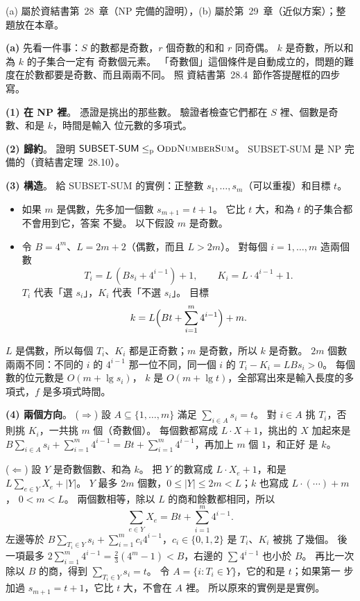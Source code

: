 \begin{pastsoln}
(a) 屬於資結書第~28~章（NP 完備的證明），(b) 屬於第~29~章（近似方案）；整題放在本章。

\textbf{(a)} 先看一件事：$S$ 的數都是奇數，$r$ 個奇數的和和 $r$ 同奇偶。 $k$ 是奇數，所以和為 $k$ 的子集合一定有
奇數個元素。 「奇數個」這個條件是自動成立的，問題的難度在於數都要是奇數、而且兩兩不同。 照
資結書第~28.4~節作答提醒框的四步寫。

\textbf{(1) 在 NP 裡}。 憑證是挑出的那些數。 驗證者檢查它們都在 $S$ 裡、個數是奇數、和是 $k$，時間是輸入
位元數的多項式。

\textbf{(2) 歸約}。 證明 $\textsf{SUBSET-SUM} \le_{\mathrm{p}} \textsc{OddNumberSum}$。 \textsf{SUBSET-SUM} 是 NP
完備的（資結書定理~28.10）。

\textbf{(3) 構造}。 給 \textsf{SUBSET-SUM} 的實例：正整數 $s_1, \ldots, s_m$（可以重複）和目標 $t$。
\begin{itemize}
\item 如果 $m$ 是偶數，先多加一個數 $s_{m+1} = t + 1$。 它比 $t$ 大，和為 $t$ 的子集合都不會用到它，答案
不變。 以下假設 $m$ 是奇數。
\item 令 $B = 4^m$、$L = 2m + 2$（偶數，而且 $L > 2m$）。 對每個 $i = 1, \ldots, m$ 造兩個數
\[
T_i = L\,(B s_i + 4^{i-1}) + 1, \qquad K_i = L \cdot 4^{i-1} + 1.
\]
$T_i$ 代表「選 $s_i$」，$K_i$ 代表「不選 $s_i$」。 目標
\[
k = L\Bigl(B t + \sum_{i=1}^{m} 4^{i-1}\Bigr) + m.
\]
\end{itemize}
$L$ 是偶數，所以每個 $T_i$、$K_i$ 都是正奇數；$m$ 是奇數，所以 $k$ 是奇數。 $2m$ 個數兩兩不同：不同的
$i$ 的 $4^{i-1}$ 那一位不同，同一個 $i$ 的 $T_i - K_i = L B s_i > 0$。 每個數的位元數是 $O(m + \lg s_i)$，
$k$ 是 $O(m + \lg t)$，全部寫出來是輸入長度的多項式，$f$ 是多項式時間。

\textbf{(4) 兩個方向}。
($\Rightarrow$) 設 $A \subseteq \{1, \ldots, m\}$ 滿足 $\sum_{i \in A} s_i = t$。 對 $i \in A$ 挑
$T_i$，否則挑 $K_i$，一共挑 $m$ 個（奇數個）。 每個數都寫成 $L \cdot X + 1$，挑出的 $X$ 加起來是
$B \sum_{i \in A} s_i + \sum_{i=1}^{m} 4^{i-1} = Bt + \sum_{i=1}^{m} 4^{i-1}$，再加上 $m$ 個 $1$，和正好
是 $k$。

($\Leftarrow$) 設 $Y$ 是奇數個數、和為 $k$。 把 $Y$ 的數寫成 $L \cdot X_e + 1$，和是
$L \sum_{e \in Y} X_e + |Y|$。 $Y$ 最多 $2m$ 個數，$0 \le |Y| \le 2m < L$；$k$ 也寫成 $L \cdot (\cdots) + m$，
$0 < m < L$。 兩個數相等，除以 $L$ 的商和餘數都相同，所以
\[
\sum_{e \in Y} X_e = B t + \sum_{i=1}^{m} 4^{i-1}.
\]
左邊等於 $B \sum_{T_i \in Y} s_i + \sum_{i=1}^{m} c_i 4^{i-1}$，$c_i \in \{0, 1, 2\}$ 是 $T_i$、$K_i$ 被挑
了幾個。 後一項最多 $2 \sum_{i=1}^{m} 4^{i-1} = \frac23(4^m - 1) < B$，右邊的 $\sum 4^{i-1}$ 也小於 $B$。
再比一次除以 $B$ 的商，得到 $\sum_{T_i \in Y} s_i = t$。 令 $A = \{i : T_i \in Y\}$，它的和是 $t$；如果第一
步加過 $s_{m+1} = t + 1$，它比 $t$ 大，不會在 $A$ 裡。 所以原來的實例是是實例。


\end{pastsoln}

